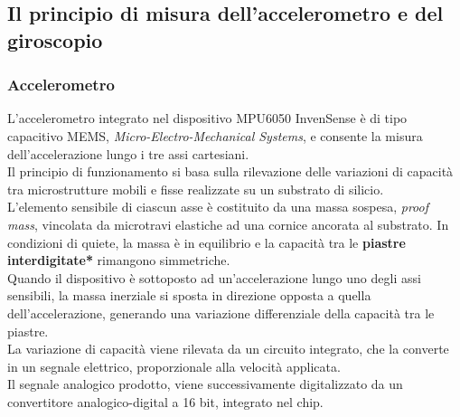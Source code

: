 \documentclass[11pt]{report}
\begin{document}
\subsection{Il principio di misura dell'accelerometro e del giroscopio}
\subsubsection{Accelerometro}
L'accelerometro integrato nel dispositivo MPU6050 InvenSense è di tipo capacitivo MEMS, \textit{Micro-Electro-Mechanical Systems}, e consente la misura dell'accelerazione lungo i tre assi cartesiani.\\
Il principio di funzionamento si basa sulla rilevazione delle variazioni di capacità tra microstrutture mobili e fisse realizzate su un substrato di silicio.\\
L'elemento sensibile di ciascun asse è costituito da una massa sospesa, \textit{proof mass}, vincolata da microtravi elastiche ad una cornice ancorata al substrato.
In condizioni di quiete, la massa è in equilibrio e la capacità tra le \textbf{piastre interdigitate*} rimangono simmetriche.\\
Quando il dispositivo è sottoposto ad un'accelerazione lungo uno degli assi sensibili, la massa inerziale si sposta in direzione opposta a quella dell'accelerazione, generando una variazione differenziale 
della capacità tra le piastre.\\
La variazione di capacità viene rilevata da un circuito integrato, che la converte in un segnale elettrico, proporzionale alla velocità applicata.\\
Il segnale analogico prodotto, viene successivamente digitalizzato da un convertitore analogico-digital a 16 bit, integrato nel chip.
\end{document}
